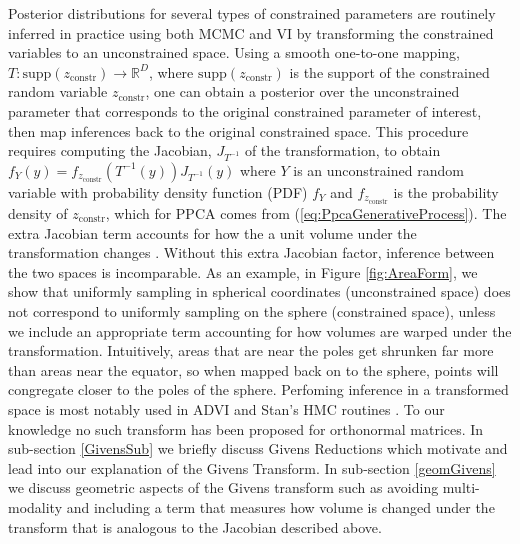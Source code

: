 \documentclass{article}
\begin{document}
Posterior distributions for several types of constrained parameters are routinely inferred in practice using both MCMC and VI by transforming the constrained variables to an unconstrained space. Using a smooth one-to-one mapping, $T: \mathrm{supp}(z_\mathrm{constr}) \to \mathbb{R}^D$, where $\mathrm{supp}(z_\mathrm{constr})$ is the support of the constrained random variable $z_\mathrm{constr}$, one can obtain a posterior over the unconstrained parameter that corresponds to the original constrained parameter of interest, then map inferences back to the original constrained space. This procedure requires computing the Jacobian, $J_{T^{-1}}$ of the transformation, to obtain $f_{Y}(y) = f_{z_\mathrm{constr}}(T^{-1}(y)) J_{T^{-1}}(y)$ where $Y$ is an unconstrained random variable with probability density function (PDF) $f_Y$ and $f_{z_\mathrm{constr}}$ is the probability density of $z_\mathrm{constr}$, which for PPCA comes from (\ref{eq:PpcaGenerativeProcess}). The extra Jacobian term accounts for how the a unit volume under the transformation changes \citep{kucukelbir2014fully}. Without this extra Jacobian factor, inference between the two spaces is incomparable. As an  example, in Figure \ref{fig:AreaForm}, we show that uniformly sampling in spherical coordinates (unconstrained space) does not correspond to uniformly sampling on the sphere (constrained space), unless we include an appropriate term accounting for how volumes are warped under the transformation. Intuitively, areas that are near the poles get shrunken far more than areas near the equator, so when mapped back on to the sphere, points will congregate closer to the poles of the sphere. Perfoming inference in a transformed space is most notably used in ADVI and Stan's HMC routines \citep{carpenter2016stan, kucukelbir2014fully}. To our knowledge no such transform has been proposed for orthonormal matrices. In sub-section \ref{GivensSub} we briefly discuss Givens Reductions which motivate and lead into our explanation of the Givens Transform. In sub-section \ref{geomGivens} we discuss geometric aspects of the Givens transform such as avoiding multi-modality and including a term that measures how volume is changed under the transform that is analogous to the Jacobian described above. 

\end{document}
